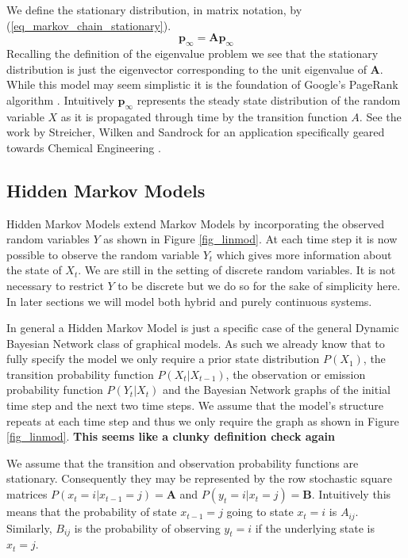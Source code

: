 \documentclass[../masters.tex]{subfiles}
\begin{document}
We define the stationary distribution, in matrix notation, by (\ref{eq_markov_chain_stationary}).
\begin{equation}
\mathbf{p}_{\infty} = \mathbf{A}\mathbf{p}_{\infty}
\label{eq_markov_chain_stationary}
\end{equation}
Recalling the definition of the eigenvalue problem we see that the stationary distribution is just the eigenvector corresponding to the unit eigenvalue of $\mathbf{A}$. While this model may seem simplistic it is the foundation of Google's PageRank algorithm \cite{google}.  Intuitively $\mathbf{p}_\infty$ represents the steady state distribution of the random variable $X$ as it is propagated through time by the transition function $A$. See the work by Streicher, Wilken and Sandrock for an application specifically geared towards Chemical Engineering \cite{streicher}.

\subsection{Hidden Markov Models}
Hidden Markov Models extend Markov Models by incorporating the observed random variables $Y$ as shown in Figure \ref{fig_linmod}. At each time step it is now possible to observe the random variable $Y_t$ which gives more information about the state of $X_t$. We are still in the setting of discrete random variables. It is not necessary to restrict $Y$ to be discrete but we do so for the sake of simplicity here. In later sections we will model both hybrid and purely continuous systems. 

In general a Hidden Markov Model is just a specific case of the general Dynamic Bayesian Network class of graphical models. As such we already know that to fully specify the model we only require a prior state distribution $P(X_1)$, the transition probability function $P(X_t|X_{t-1})$, the observation or emission probability function $P(Y_t|X_t)$ and the Bayesian Network graphs of the initial time step and the next two time steps. We assume that the model's structure repeats at each time step and thus we only require the graph as shown in Figure \ref{fig_linmod}. \textbf{This seems like a clunky definition check again}

We assume that the transition and observation probability functions are stationary. Consequently they may be represented by the row stochastic square matrices $P(x_t=i|x_{t-1}=j) = \mathbf{A}$ and $P(y_t=i|x_t=j) = \mathbf{B}$. Intuitively this means that the probability of state $x_{t-1}=j$ going to state $x_{t} = i$ is $A_{ij}$. Similarly, $B_{ij}$ is the probability of observing $y_t=i$ if the underlying state is $x_t=j$.
\end{document}
